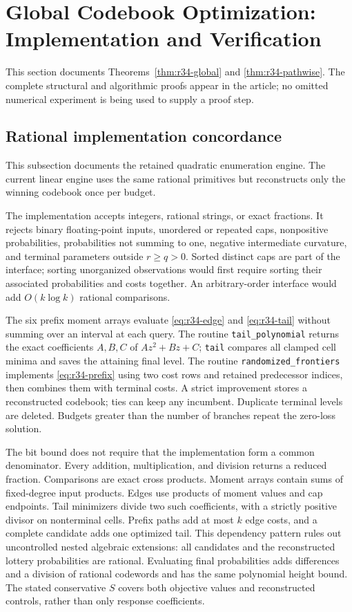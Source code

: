 \section{Global Codebook Optimization: Implementation and Verification}\label{sec:ec-r34}
This section documents Theorems~\ref{thm:r34-global} and \ref{thm:r34-pathwise}. The complete structural and algorithmic proofs appear in the article; no omitted numerical experiment is being used to supply a proof step.

\subsection{Rational implementation concordance}
This subsection documents the retained quadratic enumeration engine. The current linear engine uses the same rational primitives but reconstructs only the winning codebook once per budget.

The implementation accepts integers, rational strings, or exact fractions. It rejects binary floating-point inputs, unordered or repeated caps, nonpositive probabilities, probabilities not summing to one, negative intermediate curvature, and terminal parameters outside $r\geq q>0$. Sorted distinct caps are part of the interface; sorting unorganized observations would first require sorting their associated probabilities and costs together. An arbitrary-order interface would add $O(k\log k)$ rational comparisons.

The six prefix moment arrays evaluate \eqref{eq:r34-edge} and \eqref{eq:r34-tail} without summing over an interval at each query. The routine \texttt{tail\_polynomial} returns the exact coefficients $A,B,C$ of $Az^2+Bz+C$; \texttt{tail} compares all clamped cell minima and saves the attaining final level. The routine \texttt{randomized\_frontiers} implements \eqref{eq:r34-prefix} using two cost rows and retained predecessor indices, then combines them with terminal costs. A strict improvement stores a reconstructed codebook; ties can keep any incumbent. Duplicate terminal levels are deleted. Budgets greater than the number of branches repeat the zero-loss solution.

The bit bound does not require that the implementation form a common denominator. Every addition, multiplication, and division returns a reduced fraction. Comparisons are exact cross products. Moment arrays contain sums of fixed-degree input products. Edges use products of moment values and cap endpoints. Tail minimizers divide two such coefficients, with a strictly positive divisor on nonterminal cells. Prefix paths add at most $k$ edge costs, and a complete candidate adds one optimized tail. This dependency pattern rules out uncontrolled nested algebraic extensions: all candidates and the reconstructed lottery probabilities are rational. Evaluating final probabilities adds differences and a division of rational codewords and has the same polynomial height bound. The stated conservative $S$ covers both objective values and reconstructed controls, rather than only response coefficients.

